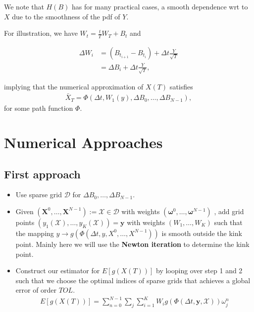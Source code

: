 \documentclass[11pt]{article}
\begin{document}
We note that $H(B)$ has for many practical cases, a smooth dependence wrt to $X$ due to the smoothness of the pdf of $Y$.

For illustration, we have  $W_t=\frac{t}{T} W_T+B_t$ and 

\begin{align}\label{Brownian_bridge}
	\Delta W_i&=(B_{t_{i+1}}-B_{t_i})+\Delta t \frac{Y}{\sqrt{T}} \nonumber\\
	&= \Delta B_i + \Delta t \frac{Y}{\sqrt{T}},
\end{align}

implying that the numerical approximation of $X(T)$ satisfies
\begin{align}
	\bar{X}_T=\Phi(\Delta t, W_1(y), \Delta B_0,\dots,\Delta B_{N-1}),
\end{align}
for some path function $\Phi$.

\section{Numerical Approaches}

\subsection{First approach}
\begin{itemize}
	\item Use sparse grid $\mathcal{D}$ for $\Delta B_0, \dots, \Delta B_{N-1}$.
	\item Given $(\mathbf{X}^0,\dots, \mathbf{X}^{N-1}):=\mathcal{X} \in \mathcal{D}$ with weights $(\boldsymbol{\omega}^0,\dots,\boldsymbol{\omega}^{N-1})$ , add grid points $(y_1(\mathcal{X}),\dots,y_K(\mathcal{X}))=\mathbf{y}$ with weights $(W_1,\dots, W_K)$ such that the mapping $y \rightarrow g(\Phi(\Delta t, y, X^0,\dots, X^{N-1}))$ is smooth outside the kink point. Mainly here we will use the \textbf{Newton iteration}  to determine the kink point.
	\item Construct our estimator for $E[g(X(T))]$ by looping over step 1 and 2 such that we choose the optimal indices of sparse grids that achieves a global error of order $TOL$.
	\begin{align*}
		E[g(X(T))]=\sum_{n=0}^{N-1}\sum_{j} \sum_{i=1}^K W_i g(\Phi(\Delta t,\mathbf{y},\mathcal{X})) \omega_{j}^n 
	\end{align*} 
\end{itemize}
\end{document}
